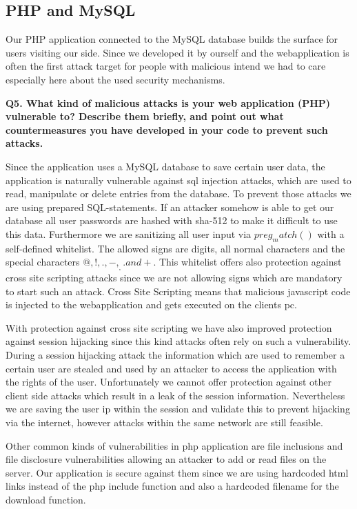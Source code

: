 \subsection {PHP and MySQL}
Our PHP application connected to the MySQL database builds the surface for users visiting our side. Since we developed it by ourself and the webapplication is often the first attack target for people with malicious intend we had to care especially here about the used security mechanisms.

\noindent
{\bf Q5. What kind of malicious attacks is your web application (PHP) vulnerable to? Describe them briefly, and point out what countermeasures you have
developed in your code to prevent such attacks.}
\newline

\noindent
Since the application uses a MySQL database to save certain user data, the application is naturally vulnerable against sql injection attacks, which are used to read, manipulate or delete entries from the database. To prevent those attacks we are using prepared SQL-statements. If an attacker somehow is able to get our database all user passwords are hashed with sha-512 to make it difficult to use this data. Furthermore we are sanitizing all user input via $preg_match()$ with a self-defined whitelist. The allowed signs are digits, all normal characters and the special characters $@,!,.,-,_,.and +$. This whitelist offers also protection against cross site scripting attacks since we are not allowing signs which are mandatory to start such an attack. Cross Site Scripting means that malicious javascript code is injected to the webapplication and gets executed on the clients pc. \cite {sqlinjection, xss}
\newline

\noindent
With protection against cross site scripting we have also improved protection against session hijacking since this kind attacks often rely on such a vulnerability. During a session hijacking attack the information which are used to remember a certain user are stealed and used by an attacker to access the application with the rights of the user. Unfortunately we cannot offer protection against other client side attacks which result in a leak of the session information. Nevertheless we are saving the user ip within the session and validate this to prevent hijacking via the internet, however attacks within the same network are still feasible.
\newline

\noindent
Other common kinds of vulnerabilities in php application are file inclusions and file disclosure vulnerabilities allowing an attacker to add or read files on the server. Our application is secure against them since we are using hardcoded html links instead of the php include function and also a hardcoded filename for the download function.










